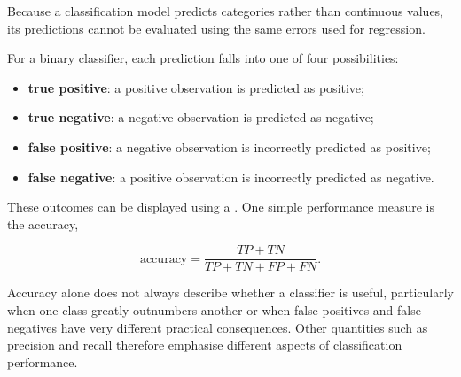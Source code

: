Because a classification model predicts categories rather than continuous values, its predictions cannot be evaluated using the same errors used for regression.

For a binary classifier, each prediction falls into one of four possibilities:

\begin{itemize}
  \item \textbf{true positive}: a positive observation is predicted as positive;
  \item \textbf{true negative}: a negative observation is predicted as negative;
  \item \textbf{false positive}: a negative observation is incorrectly predicted as positive;
  \item \textbf{false negative}: a positive observation is incorrectly predicted as negative.
\end{itemize}

These outcomes can be displayed using a .
One simple performance measure is the accuracy,

\begin{equation}
  \mathrm{accuracy} = \frac{TP + TN}{TP + TN + FP + FN}.
\end{equation}

Accuracy alone does not always describe whether a classifier is useful, particularly when one class greatly outnumbers another or when false positives and false negatives have very different practical consequences.
Other quantities such as precision and recall therefore emphasise different aspects of classification performance.

